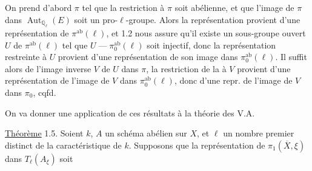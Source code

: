 
On prend  d'abord $\pi$ tel que la restriction à $\pi$ soit abélienne,  et que  l'image de $\pi$ dans $\operatorname{Aut}_{\mathbb{Q}_\ell}(E)$ soit un pro-$\ell$-groupe. Alors la représentation provient d'une représentation de $\pi^{\mathrm{ab}}(\ell)$, et  1.2 nous assure qu'il existe un sous-groupe ouvert $U$ de $\pi^{\mathrm{ab}}(\ell)$ tel que $U\mathrel{\text{---}}\pi_0^{\mathrm{ab}}(\ell)$ soit injectif, donc la représentation restreinte à $U$ provient d'une représentation de son image dans $\pi_0^{\mathrm{ab}}(\ell)$. Il suffit
alors de   l'image inverse $V$ de $U$ dans $\pi$, la restriction de la  à $V$ provient d'une représentation de l'image de $V$ dans $\pi_0^{\mathrm{ab}}(\ell)$, donc d'une repr. de l'image de $V$ dans $\pi_0$, cqfd.


On va donner une application de ces résultats à la théorie des V.A.

\uline{Théorème} 1.5. Soient $k$,     $A$ un schéma abélien sur $X$, et  $\ell$ un nombre premier distinct de la caractéristique de $k$. Supposons que la représentation de $\pi_1(\overline X,\xi)$ dans $T_\ell(A_\xi)$ soit  


